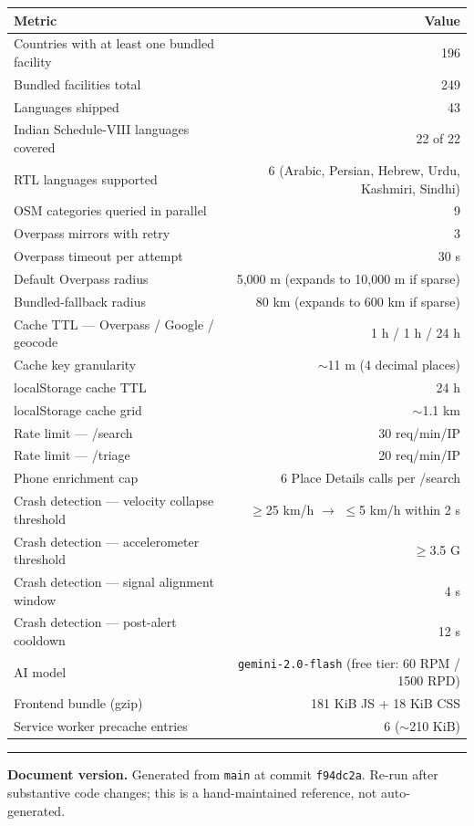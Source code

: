 \documentclass[11pt, a4paper]{article}
\newcommand{\code}[1]{\texttt{\small#1}}
\begin{document}
\begin{tabularx}{\textwidth}{X r}
\toprule
\textbf{Metric} & \textbf{Value} \\
\midrule
Countries with at least one bundled facility & 196 \\
Bundled facilities total & 249 \\
Languages shipped & 43 \\
Indian Schedule-VIII languages covered & 22 of 22 \\
RTL languages supported & 6 (Arabic, Persian, Hebrew, Urdu, Kashmiri, Sindhi) \\
OSM categories queried in parallel & 9 \\
Overpass mirrors with retry & 3 \\
Overpass timeout per attempt & 30 s \\
Default Overpass radius & 5{,}000 m (expands to 10{,}000 m if sparse) \\
Bundled-fallback radius & 80 km (expands to 600 km if sparse) \\
Cache TTL --- Overpass / Google / geocode & 1 h / 1 h / 24 h \\
Cache key granularity & $\sim$11 m (4 decimal places) \\
localStorage cache TTL & 24 h \\
localStorage cache grid & $\sim$1.1 km \\
Rate limit --- /search & 30 req/min/IP \\
Rate limit --- /triage & 20 req/min/IP \\
Phone enrichment cap & 6 Place Details calls per /search \\
Crash detection --- velocity collapse threshold & $\ge$25 km/h $\rightarrow$ $\le$5 km/h within 2 s \\
Crash detection --- accelerometer threshold & $\ge$3.5 G \\
Crash detection --- signal alignment window & 4 s \\
Crash detection --- post-alert cooldown & 12 s \\
AI model & \code{gemini-2.0-flash} (free tier: 60 RPM / 1500 RPD) \\
Frontend bundle (gzip) & 181 KiB JS + 18 KiB CSS \\
Service worker precache entries & 6 ($\sim$210 KiB) \\
\bottomrule
\end{tabularx}

\vspace{0.8cm}
\hrule
\vspace{0.4cm}
\small
\noindent
\textbf{Document version.} Generated from \code{main} at commit \texttt{f94dc2a}. Re-run after substantive code changes; this is a hand-maintained reference, not auto-generated.
\end{document}
